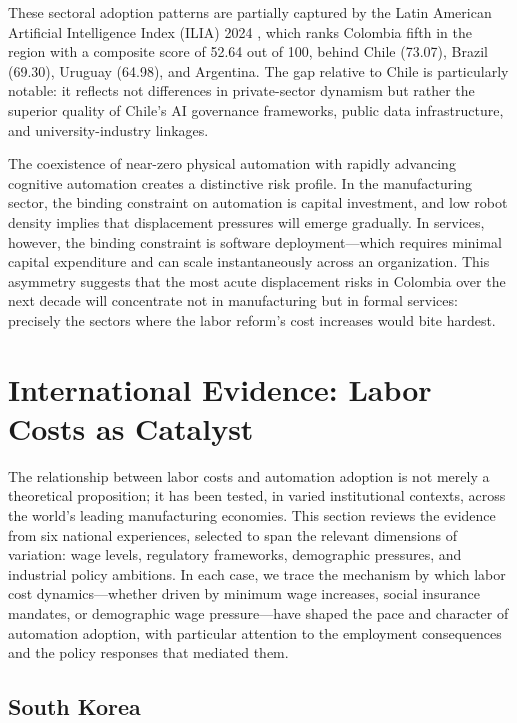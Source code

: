 \documentclass{article}
\begin{document}
These sectoral adoption patterns are partially captured by the Latin American Artificial Intelligence Index (ILIA) 2024 \cite{ilia2024}, which ranks Colombia fifth in the region with a composite score of 52.64 out of 100, behind Chile (73.07), Brazil (69.30), Uruguay (64.98), and Argentina. The gap relative to Chile is particularly notable: it reflects not differences in private-sector dynamism but rather the superior quality of Chile's AI governance frameworks, public data infrastructure, and university-industry linkages.

The coexistence of near-zero physical automation with rapidly advancing cognitive automation creates a distinctive risk profile. In the manufacturing sector, the binding constraint on automation is capital investment, and low robot density implies that displacement pressures will emerge gradually. In services, however, the binding constraint is software deployment---which requires minimal capital expenditure and can scale instantaneously across an organization. This asymmetry suggests that the most acute displacement risks in Colombia over the next decade will concentrate not in manufacturing but in formal services: precisely the sectors where the labor reform's cost increases would bite hardest.

\FloatBarrier
\section{International Evidence: Labor Costs as Catalyst}
\label{sec:international}

The relationship between labor costs and automation adoption is not merely a theoretical proposition; it has been tested, in varied institutional contexts, across the world's leading manufacturing economies. This section reviews the evidence from six national experiences, selected to span the relevant dimensions of variation: wage levels, regulatory frameworks, demographic pressures, and industrial policy ambitions. In each case, we trace the mechanism by which labor cost dynamics---whether driven by minimum wage increases, social insurance mandates, or demographic wage pressure---have shaped the pace and character of automation adoption, with particular attention to the employment consequences and the policy responses that mediated them.

\subsection{South Korea}
\label{subsec:korea}
\end{document}
